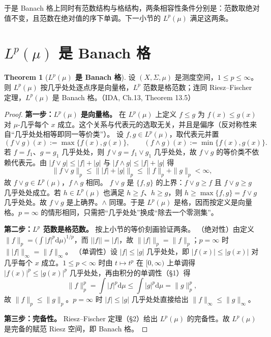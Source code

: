 \documentclass[oneside]{book}
\theoremstyle{definition}
\newcommand{\dd}{\mathrm{d}}
\theoremstyle{definition}
\newtheorem{theorem}{Theorem}[section]
\begin{document}
	于是 Banach 格上同时有范数结构与格结构，两条相容性条件分别是：范数取绝对值不变，且范数在绝对值的序下单调。下一小节的 $L^{p}(\mu)$ 满足这两条。
	\section{$L^{p}(\mu)$ 是 Banach 格}\label{sec:lp}
	
	\begin{theorem}[\bfseries{$L^{p}(\mu)$ 是 Banach 格}]
		设 $(X,\Sigma,\mu)$ 是测度空间，$1\leqslant p\leqslant\infty$。则 $L^{p}(\mu)$ 按几乎处处逐点序是向量格，$L^{p}$ 范数是格范数；连同 Riesz--Fischer 定理，$L^{p}(\mu)$ 是 Banach 格。（IDA, Ch.13, Theorem 13.5）
	\end{theorem}
	
	\begin{proof}
		\textbf{第一步：$L^{p}(\mu)$ 是向量格。}
		在 $L^{p}(\mu)$ 上定义 $f\leqslant g$ 为 $f(x)\leqslant g(x)$ 对 $\mu$-几乎每个 $x$ 成立。这个关系与代表元的选取无关，并且是偏序（反对称性来自“几乎处处相等即同一等价类”）。
		设 $f,g\in L^{p}(\mu)$，取代表元并置
		\[
		(f\vee g)(x):=\max\{f(x),g(x)\},\qquad (f\wedge g)(x):=\min\{f(x),g(x)\}.
		\]
		若 $f=f_{1}$、$g=g_{1}$ 几乎处处，则 $f\vee g=f_{1}\vee g_{1}$ 几乎处处，故 $f\vee g$ 的等价类不依赖代表元。由 $|f\vee g|\leqslant|f|+|g|$ 与 $|f\wedge g|\leqslant|f|+|g|$ 得
		\[
		\|f\vee g\|_{p}\leqslant\big\||f|+|g|\big\|_{p}\leqslant\|f\|_{p}+\|g\|_{p}<\infty,
		\]
		故 $f\vee g\in L^{p}(\mu)$，$f\wedge g$ 相同。
		$f\vee g$ 是 $\{f,g\}$ 的上界：$f\vee g\geqslant f$ 且 $f\vee g\geqslant g$ 几乎处处成立。若 $h\in L^{p}(\mu)$ 也满足 $h\geqslant f$、$h\geqslant g$，则 $h\geqslant\max\{f,g\}=f\vee g$ 几乎处处。故 $f\vee g$ 是上确界。$\wedge$ 同理。于是 $L^{p}(\mu)$ 是格，因而按定义是向量格。$p=\infty$ 的情形相同，只需把“几乎处处”换成“除去一个零测集”。
		
		\textbf{第二步：$L^{p}$ 范数是格范数。}
		按上小节的等价刻画验证两条。
		（绝对性）由定义 $\|f\|_{p}=\big(\int|f|^{p}\dd\mu\big)^{1/p}$，而 $\big||f|\big|=|f|$，故 $\big\||f|\big\|_{p}=\|f\|_{p}$；$p=\infty$ 时 $\big\||f|\big\|_{\infty}=\|f\|_{\infty}$。
		（单调性）设 $|f|\leqslant|g|$ 几乎处处，即 $|f(x)|\leqslant|g(x)|$ 对几乎每个 $x$ 成立。$1\leqslant p<\infty$ 时由 $t\mapsto t^{p}$ 在 $[0,\infty)$ 上单调得 $|f(x)|^{p}\leqslant|g(x)|^{p}$ 几乎处处，再由积分的单调性（\S 1）得
		\[
		\|f\|_{p}^{p}=\int|f|^{p}\dd\mu\leqslant\int|g|^{p}\dd\mu=\|g\|_{p}^{p},
		\]
		故 $\|f\|_{p}\leqslant\|g\|_{p}$。$p=\infty$ 时 $|f|\leqslant|g|$ 几乎处处直接给出 $\|f\|_{\infty}\leqslant\|g\|_{\infty}$。
		
		\textbf{第三步：完备性。}
		Riesz--Fischer 定理（\S 2）给出 $L^{p}(\mu)$ 的完备性。故 $L^{p}(\mu)$ 是完备的赋范 Riesz 空间，即 Banach 格。
	\end{proof}
	
\end{document}
